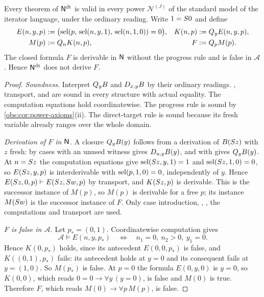 \begin{theorem}
\label{obs:thm:direct-target}
Every theorem of $\mathsf{N}^{\mathrm{dt}}$ is valid in every power
$\mathcal{N}^{(J)}$ of the standard model of the iterator language, under the
ordinary reading. Write $1=S 0$ and define
\begin{align*}
E(n,y,p)&\mathrel{:=}\bigl(\operatorname{sel}(p,\,\operatorname{sel}(n,y,1),\,\operatorname{sel}(n,1,0))=0\bigr), &
K(n,p)&\mathrel{:=}Q_{y}E(n,y,p),\\
M(p)&\mathrel{:=}Q_{n}K(n,p), &
F&\mathrel{:=}Q_{p}M(p).
\end{align*}
The closed formula $F$ is derivable in $\mathsf{N}$ without the progress rule and is
false in $\mathcal{A}$. Hence $\mathsf{N}^{\mathrm{dt}}$ does not derive $F$.
\end{theorem}

\begin{proof}
\emph{Soundness.} Interpret $Q_{y}B$ and $D_{x,y}B$ by their ordinary
readings. , transport,  and  are sound
in every structure with actual equality. The computation equations hold
coordinatewise. The progress rule is sound by
\cref{obs:cor:power-axioms}(ii). The direct-target rule is sound because its
fresh variable already ranges over the whole domain.

\emph{Derivation of $F$ in $\mathsf{N}$.} A closure $Q_{y}B(y)$ follows from a
derivation of $B(S z)$ with $z$ fresh:  by cases with an unused
witness gives $D_{u,y}B(y)$, and  with  gives
$Q_{y}B(y)$. At $n=S z$ the computation equations give
$\operatorname{sel}(S z,y,1)=1$ and $\operatorname{sel}(S z,1,0)=0$, so $E(S z,y,p)$ is
interderivable with $\operatorname{sel}(p,1,0)=0$, independently of $y$. Hence
$E(S z,0,p)\vdash E(S z,S w,p)$ by transport, and $K(S z,p)$ is
derivable. This is the successor instance of $M(p)$, so $M(p)$ is derivable
for a free $p$; its instance $M(S w)$ is the successor instance of $F$.
Only case introduction, , , the computations and
transport are used.

\emph{$F$ is false in $\mathcal{A}$.} Let $p_*=(0,1)$. Coordinatewise
computation gives
\[
\mathcal{A}\models E(n,y,p_*)
\quad\Longleftrightarrow\quad n_1=0,\ n_2>0,\ y_1=0 .
\]
Hence $K(0,p_*)$ holds, since its antecedent $E(0,0,p_*)$ is false, and
$K((0,1),p_*)$ fails: its antecedent holds at $y=0$ and its consequent fails at
$y=(1,0)$. So $M(p_*)$ is false. At $p=0$ the formula $E(0,y,0)$ is $y=0$, so
$K(0,0)$, which reads $0=0\to\forall y\,(y=0)$, is false and $M(0)$ is true.
Therefore $F$, which reads $M(0)\to\forall p\,M(p)$, is false.
\end{proof}

